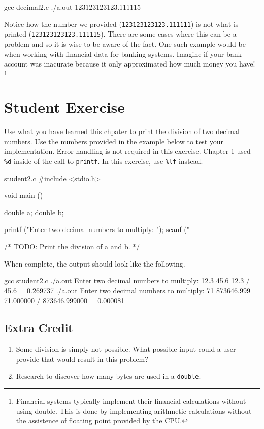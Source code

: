 \begin{Terminal}
gcc decimal2.c
./a.out
123123123123.111115
\end{Terminal}

Notice how the number we provided (\verb|123123123123.111111|) is not what is
printed (\verb|123123123123.111115|).  There are some cases where this can be a
problem and so it is wise to be aware of the fact.  One such example would be
when working with financial data for banking systems.  Imagine if your bank
account was inacurate because it only approximated how much money you have!
\footnote{Financial systems typically implement their financial calculations
without using double. This is done by implementing arithmetic calculations
without the assistence of floating point provided by the CPU.}


\section{Student Exercise}

Use what you have learned this chpater to print the division of two decimal
numbers. Use the numbers provided in the example below to test your
implementation. Error handling is not required in this exercise. Chapter 1 used
\verb|%d| inside of the call to \verb|printf|. In this exercise, use \verb|%lf|
instead.

\begin{code}{student2.c}
#include <stdio.h>

void main ()
{
    double a;
    double b;

    printf ("Enter two decimal numbers to multiply: ");
    scanf ("%

    /* TODO: Print the division of a and b. */
}
\end{code}

When complete, the output should look like the following.

\begin{Terminal}
gcc student2.c
./a.out
Enter two decimal numbers to multiply: 12.3 45.6
12.3 / 45.6 = 0.269737
./a.out
Enter two decimal numbers to multiply: 71 873646.999
71.000000 / 873646.999000 = 0.000081
\end{Terminal}

\subsection{Extra Credit}

\begin{enumerate}
\item Some division is simply not possible. What possible input could a user provide
that would result in this problem?
\item Research to discover how many bytes are used in a \verb|double|.
\end{enumerate}
